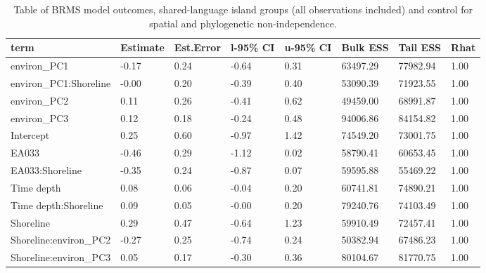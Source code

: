\begin{table}[ht]
\centering
\begin{tabular}{p{3cm}p{1.35cm}p{1.35cm}p{1.35cm}p{1.35cm}p{1.35cm}p{1.35cm}p{1.35cm}}
  \toprule
term & Estimate & Est.Error & l-95\% CI & u-95\% CI & Bulk ESS & Tail ESS & Rhat \\ 
  \midrule
environ\_PC1 & -0.17 & 0.24 & -0.64 & 0.31 & 63497.29 & 77982.94 & 1.00 \\ 
  environ\_PC1:Shoreline & -0.00 & 0.20 & -0.39 & 0.40 & 53090.39 & 71923.55 & 1.00 \\ 
  environ\_PC2 & 0.11 & 0.26 & -0.41 & 0.62 & 49459.00 & 68991.87 & 1.00 \\ 
  environ\_PC3 & 0.12 & 0.18 & -0.24 & 0.48 & 94006.86 & 84154.82 & 1.00 \\ 
  Intercept & 0.25 & 0.60 & -0.97 & 1.42 & 74549.20 & 73001.75 & 1.00 \\ 
  EA033 & -0.46 & 0.29 & -1.12 & 0.02 & 58790.41 & 60653.45 & 1.00 \\ 
  EA033:Shoreline & -0.35 & 0.24 & -0.87 & 0.07 & 59595.88 & 55469.22 & 1.00 \\ 
  Time depth & 0.08 & 0.06 & -0.04 & 0.20 & 60741.81 & 74890.21 & 1.00 \\ 
  Time depth:Shoreline & 0.09 & 0.05 & -0.00 & 0.20 & 79240.76 & 74103.49 & 1.00 \\ 
  Shoreline & 0.29 & 0.47 & -0.64 & 1.23 & 59910.49 & 72457.41 & 1.00 \\ 
  Shoreline:environ\_PC2 & -0.27 & 0.25 & -0.74 & 0.24 & 50382.94 & 67486.23 & 1.00 \\ 
  Shoreline:environ\_PC3 & 0.05 & 0.17 & -0.30 & 0.36 & 80104.67 & 81770.75 & 1.00 \\ 
   \bottomrule
\end{tabular}
\caption{Table of BRMS model outcomes, shared-language island groups (all observations included) and control for spatial and phylogenetic non-independence.} 
\label{BRMS_effects_medium_control_sp}
\end{table}
